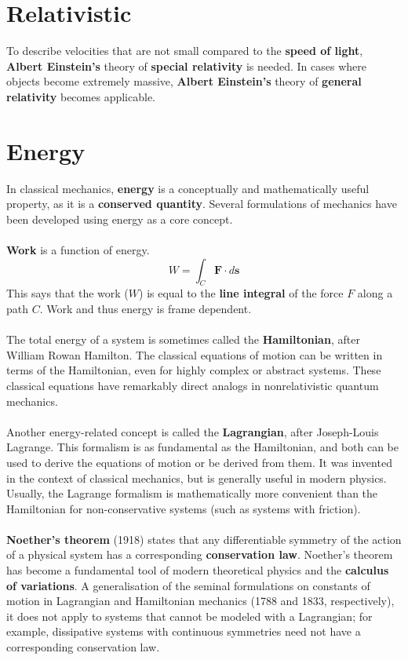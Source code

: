 \documentclass[a4paper, 12pt]{book}
\begin{document}
\section{Relativistic}
To describe velocities that are not small compared to the \textbf{speed of light}, \textbf{Albert Einstein's} theory of \textbf{special relativity} is needed. In cases where objects become extremely massive, \textbf{Albert Einstein's} theory of \textbf{general relativity} becomes applicable.

\section{Energy}
In classical mechanics, \textbf{energy} is a conceptually and mathematically useful property, as it is a \textbf{conserved quantity}. Several formulations of mechanics have been developed using energy as a core concept.
\\\\
\textbf{Work} is a function of energy.
\[
W = \int_C \mathbf{F}\cdot d\mathbf{s}
\]
This says that the work ($W$) is equal to the \textbf{line integral} of the force $F$ along a path $C$. Work and thus energy is frame dependent.
\\\\
The total energy of a system is sometimes called the \textbf{Hamiltonian}, after William Rowan Hamilton. The classical equations of motion can be written in terms of the Hamiltonian, even for highly complex or abstract systems. These classical equations have remarkably direct analogs in nonrelativistic quantum mechanics.
\\\\
Another energy-related concept is called the \textbf{Lagrangian}, after Joseph-Louis Lagrange. This formalism is as fundamental as the Hamiltonian, and both can be used to derive the equations of motion or be derived from them. It was invented in the context of classical mechanics, but is generally useful in modern physics. Usually, the Lagrange formalism is mathematically more convenient than the Hamiltonian for non-conservative systems (such as systems with friction).
\\\\
\textbf{Noether's theorem} (1918) states that any differentiable symmetry of the action of a physical system has a corresponding \textbf{conservation law}. Noether's theorem has become a fundamental tool of modern theoretical physics and the \textbf{calculus of variations}. A generalisation of the seminal formulations on constants of motion in Lagrangian and Hamiltonian mechanics (1788 and 1833, respectively), it does not apply to systems that cannot be modeled with a Lagrangian; for example, dissipative systems with continuous symmetries need not have a corresponding conservation law.
\end{document}
